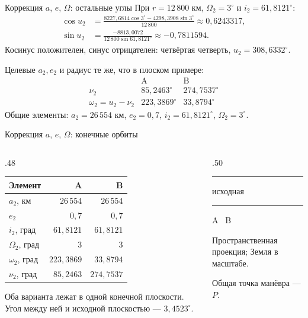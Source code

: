 \documentclass[11pt,aspectratio=169,t]{beamer}
\newcommand{\figurelegend}{%
 {\usebeamerfont{caption}\color{coursemuted}
 \textcolor{courseink}{\rule[.6ex]{5mm}{.5pt}} исходная\quad
 \textcolor{courseaccent}{\rule[.6ex]{5mm}{.6pt}} A\quad
 \textcolor{coursemuted}{\textendash\,\textendash} B\par}}
\begin{document}
\begin{frame}{Коррекция $a$, $e$, $\Omega$: остальные углы}
\justifying
При $r=12\,800$ км, $\Omega_2=3^\circ$ и $i_2=61{,}8121^\circ$:
\begin{align*}
\cos u_2&=\frac{8227{,}6814\cos3^\circ-4298{,}3908\sin3^\circ}{12\,800}
\approx0{,}6243317,\\[2pt]
\sin u_2&=\frac{-8813{,}0072}{12\,800\sin61{,}8121^\circ}\approx-0{,}7811594.
\end{align*}
Косинус положителен, синус отрицателен: четвёртая четверть,
$\boxed{u_2=308{,}6332^\circ}$.
\par\smallskip
Целевые $a_2,e_2$ и радиус те же, что в плоском примере:
\[
\begin{array}{c|cc}
 & \text{A} & \text{B}\\\hline
\nu_2 & 85{,}2463^\circ & 274{,}7537^\circ\\
\omega_2=u_2-\nu_2 & 223{,}3869^\circ & 33{,}8794^\circ
\end{array}
\]
\justifying
Общие элементы: $a_2=26\,554$ км, $e_2=0{,}7$,
$i_2=61{,}8121^\circ$, $\Omega_2=3^\circ$.
\end{frame}

\begin{frame}{Коррекция $a$, $e$, $\Omega$: конечные орбиты}
\begin{columns}[T,onlytextwidth]
\begin{column}{.48\textwidth}
\centering
\renewcommand{\arraystretch}{1.14}
\begin{tabular}{@{}lrr@{}}
\toprule
Элемент & A & B\\\midrule
$a_2$, км & $26\,554$ & $26\,554$\\
$e_2$ & $0{,}7$ & $0{,}7$\\
$i_2$, град & $61{,}8121$ & $61{,}8121$\\
$\Omega_2$, град & $3$ & $3$\\
$\omega_2$, град & $223{,}3869$ & $33{,}8794$\\
$\nu_2$, град & $85{,}2463$ & $274{,}7537$\\\bottomrule
\end{tabular}\par\medskip
\justifying
Оба варианта лежат в одной конечной плоскости.
Угол между ней и исходной плоскостью --- $3{,}4523^\circ$.
\end{column}
\begin{column}{.50\textwidth}
\centering\par\figurelegend
{\color{coursemuted}
Пространственная проекция; Земля в масштабе.\par
Общая точка манёвра --- $P$.\par}
\end{column}
\end{columns}
\end{frame}
\end{document}
